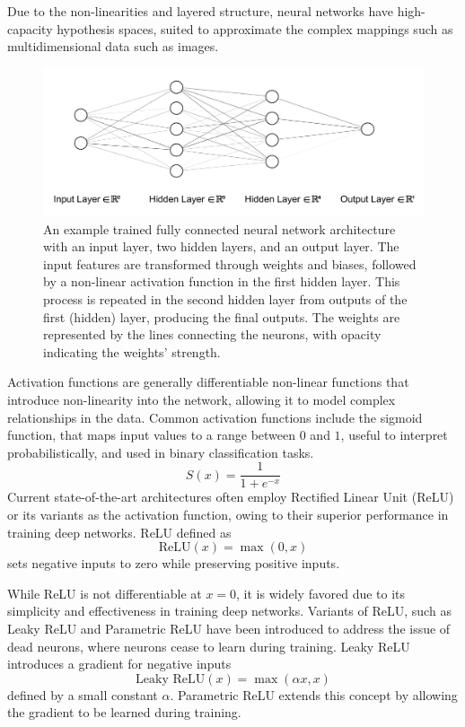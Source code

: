 Due to the non-linearities and layered structure, neural networks have high-capacity hypothesis spaces, suited to approximate the complex mappings such as multidimensional data such as images. 

\begin{figure}[h]
    \centering
    \includegraphics[width=1\linewidth]{images/simple_nn_architecture.pdf}
    \caption{An example trained fully connected neural network architecture with an input layer, two hidden layers, and an output layer. The input features are transformed through weights and biases, followed by a non-linear activation function in the first hidden layer. This process is repeated in the second hidden layer from outputs of the first (hidden) layer, producing the final outputs. The weights are represented by the lines connecting the neurons, with opacity indicating the weights' strength.}
    \label{fig:simple-nn-architecture}
\end{figure}

Activation functions are generally differentiable non-linear functions that introduce non-linearity into the network, allowing it to model complex relationships in the data. Common activation functions include the sigmoid function, that maps input values to a range between $0$ and $1$, useful to interpret probabilistically, and used in binary classification tasks. 
\begin{equation}
    S(x) = \frac{1}{1 + e^{-x}}
\end{equation}
Current state-of-the-art architectures often employ Rectified Linear Unit (ReLU) or its variants as the activation function, owing to their superior performance in training deep networks. ReLU defined as
\begin{equation}
    \text{ReLU}(x) = \max(0, x)
\end{equation}
sets negative inputs to zero while preserving positive inputs.

While ReLU is not differentiable at $x = 0$, it is widely favored due to its simplicity and effectiveness in training deep networks. Variants of ReLU, such as Leaky ReLU and Parametric ReLU have been introduced to address the issue of dead neurons, where neurons cease to learn during training. Leaky ReLU introduces a gradient for negative inputs
\begin{equation}
    \text{Leaky ReLU}(x) = \max(\alpha x, x)
\end{equation}
defined by a small constant $\alpha$. Parametric ReLU extends this concept by allowing the gradient to be learned during training.

